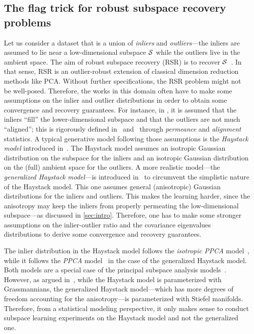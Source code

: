 \subsection{The flag trick for robust subspace recovery problems}
Let us consider a dataset that is a union of \textit{inliers} and \textit{outliers}---the inliers are assumed to lie near a low-dimensional subspace $\S$ while the outliers live in the ambient space. The aim of robust subspace recovery (RSR) is to recover $\S$~\citep{lerman_overview_2018}. In that sense, RSR is an outlier-robust extension of classical dimension reduction methods like PCA.
Without further specifications, the RSR problem might not be well-posed. Therefore, the works in this domain often have to make some assumptions on the inlier and outlier distributions in order to obtain some convergence and recovery guarantees.
For instance, in \citet{lerman_overview_2018}, it is assumed that the inliers ``fill'' the lower-dimensional subspace and that the outliers are not much ``aligned''; this is rigorously defined in~\citet{lerman_robust_2015} and~\citet{maunu_well-tempered_2019} through \textit{permeance} and \textit{alignment} statistics.
A typical generative model following those assumptions is the \textit{Haystack model} introduced in~\citet{lerman_robust_2015}. The Haystack model assumes an isotropic Gaussian distribution on the subspace for the inliers and an isotropic Gaussian distribution on the (full) ambient space for the outliers. A more realistic model---the \textit{generalized Haystack model}---is introduced in~\citet{maunu_well-tempered_2019} to circumvent the simplistic nature of the Haystack model. This one assumes general (anisotropic) Gaussian distributions for the inliers and outliers. This makes the learning harder, since the anisotropy may keep the inliers from properly permeating the low-dimensional subspace---as discussed in \autoref{sec:intro}. Therefore, one has to make some stronger assumptions on the inlier-outlier ratio and the covariance eigenvalues distributions to derive some convergence and recovery guarantees.
\begin{remark}
The inlier distribution in the Haystack model follows the \textit{isotropic PPCA} model~\citep{bouveyron_hddc_2007, bouveyron_intrinsic_2011}, while it follows the \textit{PPCA} model~\citep{tipping_probabilistic_1999} in the case of the generalized Haystack model. Both models are a special case of the principal subspace analysis models~\citep{szwagier_curse_2024}. However, as argued in~\citet{szwagier_curse_2024}, while the Haystack model is parameterized with Grassmannians, the generalized Haystack model---which has more degrees of freedom accounting for the anisotropy---is parameterized with Stiefel manifolds. Therefore, from a statistical modeling perspective, it only makes sense to conduct subspace learning experiments on the Haystack model and not the generalized one.
\end{remark}


